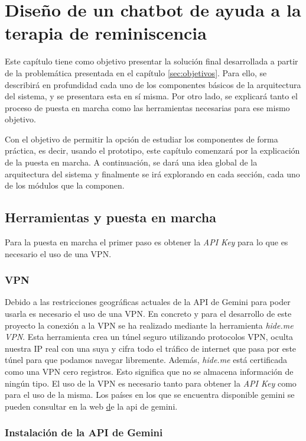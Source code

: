 \chapter{Diseño de un chatbot de ayuda a la terapia de reminiscencia}
\label{cap:ChatBot final}
Este capítulo tiene como objetivo presentar la solución final desarrollada a partir de la problemática presentada en el capítulo \ref{sec:objetivos}. Para ello, se describirá en profundidad cada uno de los componentes básicos de la arquitectura del sistema, y se presentara esta en sí misma. Por otro lado, se explicará tanto el proceso de puesta en marcha como las herramientas necesarias para ese mismo objetivo. 

Con el objetivo de permitir la opción de estudiar los componentes de forma práctica, es decir, usando el prototipo, este capítulo comenzará por la explicación de la puesta en marcha. A continuación, se dará una idea global de la arquitectura del sistema y finalmente se irá explorando en cada sección, cada uno de los módulos que la componen. 
\section{Herramientas y puesta en marcha}
Para la puesta en marcha el primer paso es obtener la \textit{API Key} para lo que es necesario el uso de una VPN.
\subsection{VPN}
Debido a las restricciones geográficas actuales de la API de Gemini para poder usarla es necesario el uso de una VPN. En concreto y para el desarrollo de este proyecto la conexión a la VPN se ha realizado mediante la herramienta \textit{hide.me VPN}. Esta herramienta crea un túnel seguro utilizando protocolos VPN, oculta nuestra IP real con una suya y cifra todo el tráfico de internet que pasa por este túnel para que podamos navegar libremente. Además, \textit{hide.me} está certificada como una VPN cero registros. Esto significa que no se almacena información de ningún tipo. El uso de la VPN es necesario tanto para obtener la \textit{API Key} como para el uso de la misma. Los países en los que se encuentra disponible gemini se pueden consultar en la web \href{https://ai.google.dev/gemini-api/docs/available-regions?hl=es-419} de la api de gemini. 

\subsection{Instalación de la API de Gemini}

